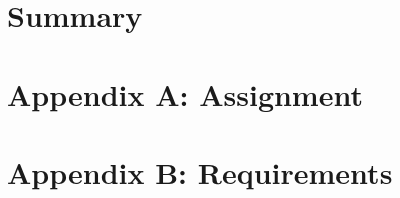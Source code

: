 \documentclass[a4paper,12pt,twoside]{scrreprt}
\begin{document}
\chapter{Summary}
\label{chap:Summary}


%
%

\chapter*{Appendix A: Assignment}  %
\label{chap:AppendixAAssignment}



\chapter*{Appendix B: Requirements}  %
\label{chap:AppendixBRequirements}

\end{document}
